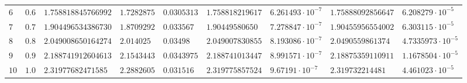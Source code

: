 \begin{table}[h!]
\begin{tabular}{|p{2ex}|p{3ex}|l|l|l|l|l|l|l|}
		$  6 $ & $  0.6 $                & $ 1.758818845766992 $  & $ 1.7282875 $            & $ 0.0305313 $            & $ 1.758818219617 $       & $ 6.261493\cdot 10^{-7} $ & $ 1.75888092856647 $     & $  6.208279\cdot 10^{-5} $ \\
		$  7 $ & $  0.7 $                & $ 1.904496534386730 $  & $ 1.8709292 $            & $  0.033567 $            & $  1.90449580650 $       & $ 7.278847\cdot 10^{-7} $ & $ 1.90455956554002 $     & $  6.303115\cdot 10^{-5} $ \\
		$  8 $ & $                 0.8 $ & $ 2.049008650164274 $  & $  2.014025 $            & $   0.03498 $            & $ 2.049007830855 $       & $ 8.193086\cdot 10^{-7} $ & $  2.0490559861374 $     & $ 4.7335973\cdot 10^{-5} $ \\
		$  9 $ & $                 0.9 $ & $ 2.188741912604613 $  & $ 2.1543443 $            & $ 0.0343975 $            & $ 2.188741013447 $       & $ 8.991571\cdot 10^{-7} $ & $ 2.18875359110911 $     & $ 1.1678504\cdot 10^{-5} $ \\
		$ 10 $ & $                 1.0 $ & $  2.31977682471585 $  & $ 2.2882605 $            & $  0.031516 $            & $ 2.319775857524 $       & $  9.67191\cdot 10^{-7} $ & $   2.319732214481 $     & $  4.461023\cdot 10^{-5} $ \\
		\hline
	\end{tabular}
\end{table}

